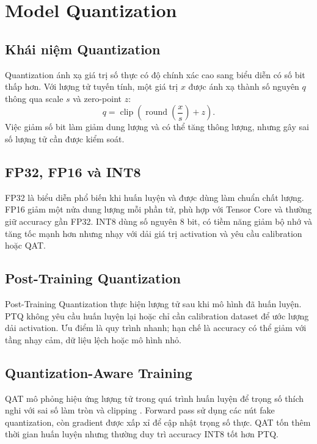 \section{Model Quantization}

\subsection{Khái niệm Quantization}

Quantization ánh xạ giá trị số thực có độ chính xác cao sang biểu diễn có số bit
thấp hơn. Với lượng tử tuyến tính, một giá trị $x$ được ánh xạ thành số nguyên
$q$ thông qua scale $s$ và zero-point $z$:
\begin{equation}
  q=\operatorname{clip}\left(\operatorname{round}\left(\frac{x}{s}\right)+z\right).
\end{equation}
Việc giảm số bit làm giảm dung lượng và có thể tăng thông lượng, nhưng gây sai số
lượng tử cần được kiểm soát.

\subsection{FP32, FP16 và INT8}

FP32 là biểu diễn phổ biến khi huấn luyện và được dùng làm chuẩn chất lượng.
FP16 giảm một nửa dung lượng mỗi phần tử, phù hợp với Tensor Core và thường giữ
accuracy gần FP32. INT8 dùng số nguyên 8 bit, có tiềm năng giảm bộ nhớ và tăng
tốc mạnh hơn nhưng nhạy với dải giá trị activation và yêu cầu calibration hoặc
QAT.

\subsection{Post-Training Quantization}

Post-Training Quantization thực hiện lượng tử sau khi mô hình đã huấn luyện. PTQ
không yêu cầu huấn luyện lại hoặc chỉ cần calibration dataset để ước lượng dải
activation. Ưu điểm là quy trình nhanh; hạn chế là accuracy có thể giảm với tầng
nhạy cảm, dữ liệu lệch hoặc mô hình nhỏ.

\subsection{Quantization-Aware Training}

QAT mô phỏng hiệu ứng lượng tử trong quá trình huấn luyện để trọng số thích nghi
với sai số làm tròn và clipping \cite{jacob2018}. Forward pass sử dụng các nút
fake quantization, còn gradient được xấp xỉ để cập nhật trọng số thực. QAT tốn
thêm thời gian huấn luyện nhưng thường duy trì accuracy INT8 tốt hơn PTQ.


